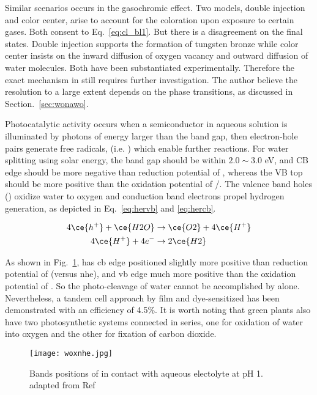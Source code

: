 Similar scenarios occurs in the gasochromic effect. Two models, double injection and color center, arise to account for the coloration upon exposure to certain gases. Both consent to Eq.~\ref{eq:cl_bl1}. But there is a disagreement on the final states. Double injection supports the formation of tungsten bronze  while color center insists on the inward diffusion of oxygen vacancy and outward diffusion of water molecules. Both have been substantiated experimentally. Therefore the exact mechanism in  still requires further investigation. The author believe the resolution to a large extent depends on the phase transitions, as discussed in Section.~\ref{sec:wonawo}.

Photocatalytic activity occurs when a semiconductor in aqueous solution is illuminated by photons of energy larger than the band gap, then electron-hole pairs generate free radicals, (i.e. ) which enable further reactions. For water splitting using solar energy, the band gap should be within $2.0 \sim 3.0 $ eV, and CB edge should be more negative than reduction potential of , whereas the VB top should be more positive than the oxidation potential of /.\cite{Wang2012} The valence band holes () oxidize water to oxygen and conduction band electrons propel hydrogen generation, as depicted in Eq.~\ref{eq:hervb} and \ref{eq:hercb}.

\begin{align}
4\ce{h^+} +  \ce{H2O} &\rightarrow \ce{O2} + 4\ce{H^+} \label{eq:hervb}\\
4\ce{H^+} +  4e^- &\rightarrow 2\ce{H2} \label{eq:hercb}
\end{align}

As shown in Fig.~\ref{fig:woxnhe},  has \gls{cb} edge positioned slightly more positive than reduction potential of (versus \gls{nhe}), and \gls{vb} edge much more positive than the oxidation potential of . So the photo-cleavage of water cannot be accomplished by  alone. Nevertheless, a tandem cell approach by  film and dye-sensitized  has been demonstrated with an efficiency of 4.5\%.\cite{Michael1999} It is worth noting that green plants also have two photosynthetic systems connected in series, one for oxidation of water into oxygen and the other for fixation of carbon dioxide.

\begin{figure}[htb]
\centering
\texttt{[image: woxnhe.jpg]}
\caption[Bands positions of  versus NHE]{Bands positions of  in contact with aqueous electolyte at pH 1. adapted from Ref\cite{Gratzel2001}}
\label{fig:woxnhe}
\end{figure}

